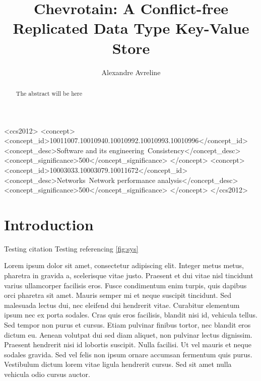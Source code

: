 \documentclass[sigconf,nonacm]{acmart}
\begin{document}
\title{Chevrotain: A Conflict-free Replicated Data Type Key-Value Store}

\author{Alexandre Avreline}

\begin{abstract}
The abstract will be here
\end{abstract}


\begin{CCSXML}
<ccs2012>
   <concept>
       <concept_id>10011007.10010940.10010992.10010993.10010996</concept_id>
       <concept_desc>Software and its engineering~Consistency</concept_desc>
       <concept_significance>500</concept_significance>
       </concept>
   <concept>
       <concept_id>10003033.10003079.10011672</concept_id>
       <concept_desc>Networks~Network performance analysis</concept_desc>
       <concept_significance>500</concept_significance>
       </concept>
 </ccs2012>
\end{CCSXML}




\maketitle

\section{Introduction}
Testing citation \cite{Davey:Lattices}
Testing referencing \ref{fig:sys}

Lorem ipsum dolor sit amet, consectetur adipiscing elit. Integer metus metus, pharetra in gravida a, scelerisque vitae justo. Praesent et dui vitae nisl tincidunt varius ullamcorper facilisis eros. Fusce condimentum enim turpis, quis dapibus orci pharetra sit amet. Mauris semper mi et neque suscipit tincidunt. Sed malesuada lectus dui, nec eleifend dui hendrerit vitae. Curabitur elementum ipsum nec ex porta sodales. Cras quis eros facilisis, blandit nisi id, vehicula tellus. Sed tempor non purus et cursus. Etiam pulvinar finibus tortor, nec blandit eros dictum eu. Aenean volutpat dui sed diam aliquet, non pulvinar lectus dignissim. Praesent hendrerit nisi id lobortis suscipit. Nulla facilisi. Ut vel mauris et neque sodales gravida. Sed vel felis non ipsum ornare accumsan fermentum quis purus. Vestibulum dictum lorem vitae ligula hendrerit cursus. Sed sit amet nulla vehicula odio cursus auctor.
\end{document}
